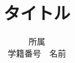 \documentclass[11pt,a4j]{jarticle}
\title{タイトル}
\author{所属 \\ 学籍番号　名前}
\date{}
\begin{document}
\maketitle

\begin{lstlisting}[caption=caption,label=label,basicstyle=\ttfamily\footnotesize, frame=single]

\end{lstlisting}
\end{document}
